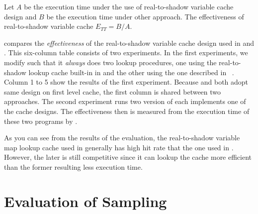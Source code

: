\begin{mydef}\label{l:effectiveness-ThreadTracer-real-to-shadow-cache}
Let $A$ be the execution time under the use of \ThreadTracer{} real-to-shadow variable cache design and $B$ be the execution time under other approach. The effectiveness of \ThreadTracer{} real-to-shadow variable cache $E_{TT} = B / A$.
\end{mydef}

 compares the \textit{effectiveness} of the real-to-shadow variable cache design used in \ThreadTracer{} and \RoadRunner{}. This six-column table consists of two experiments. In the first experiments, we modify \ThreadTracer{} such that it \textit{always} does two lookup procedures, one using the real-to-shadow lookup cache built-in in \ThreadTracer{} and the other using the one described in \RoadRunner{}~\cite{Flanagan:2010p71}. Column 1 to 5 show the results of the first experiment. Because \ThreadTracer{} and \RoadRunner{} both adopt same design on first level cache, the first column is shared between two approaches. The second experiment runs two version of \ThreadTracer{} each implements one of the cache designs. The effectiveness then is measured from the execution time of these two programs by .

As you can see from the results of the evaluation, the real-to-shadow variable map lookup cache used in \RoadRunner{} generally has high hit rate that the one used in \ThreadTracer{}. However, the later is still competitive since it can lookup the cache more efficient than the former resulting less execution time.

\section{Evaluation of Sampling}

